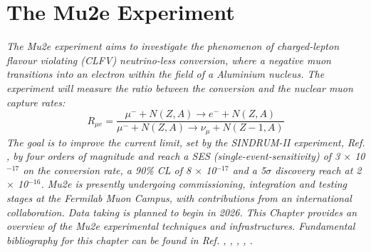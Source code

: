 \chapter{The Mu2e Experiment}\label{mu2echapter}
\textit{
The Mu2e experiment aims to investigate the phenomenon of charged-lepton flavour violating (CLFV) neutrino-less conversion, where a negative muon transitions into an electron within the field of a Aluminium nucleus. The experiment will measure the ratio between the conversion and the nuclear muon capture rates:
\begin{equation}\label{rmue}
R_{\mu e}=\frac{\mu^{-}+N(Z, A) \rightarrow e^{-}+N(Z, A)}{\mu^{-}+N(Z, A) \rightarrow \nu_\mu+N(Z-1, A)}
\end{equation}
The goal is to improve the current limit, set by the SINDRUM-II experiment, Ref. \cite{SINDRUMII:2006dvw}, by
four orders of magnitude and reach a SES (single-event-sensitivity) of 3 $\times$ 10$^{-17}$ on the
conversion rate, a 90\% CL of 8 $\times$ 10$^{-17}$ and a 5$\sigma$ discovery reach at 2 $\times$ 10$^{-16}$.
Mu2e is presently undergoing commissioning, integration and testing stages at the Fermilab Muon Campus, 
with contributions from an international collaboration. Data taking is planned to begin in 2026. 
This Chapter provides an overview of the Mu2e experimental techniques and infrastructures. 
Fundamental bibliography for this chapter can be found in Ref. \cite{bartoszek2015mu2e}, 
\cite{bobbb}, \cite{Bernstein_2013}, \cite{Kargiantoulakis_2020}, \cite{universe9010054}.}
